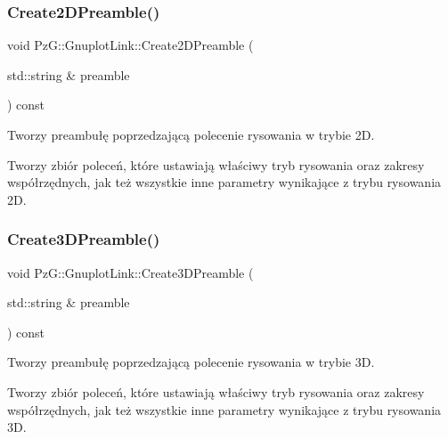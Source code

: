 \subsubsection{\texorpdfstring{Create2\+D\+Preamble()}{Create2DPreamble()}}
{\footnotesize\ttfamily void Pz\+G\+::\+Gnuplot\+Link\+::\+Create2\+D\+Preamble (\begin{DoxyParamCaption}\item[{std\+::string \&}]{preamble }\end{DoxyParamCaption}) const\hspace{0.3cm}{\ttfamily [protected]}}



Tworzy preambułę poprzedzającą polecenie rysowania w trybie 2D. 

Tworzy zbiór poleceń, które ustawiają właściwy tryb rysowania oraz zakresy współrzędnych, jak też wszystkie inne parametry wynikające z trybu rysowania 2D. \mbox{\label{class_pz_g_1_1_gnuplot_link_a475373e9f4e3ea655a64e7daabd56ac9}} 
\subsubsection{\texorpdfstring{Create3\+D\+Preamble()}{Create3DPreamble()}}
{\footnotesize\ttfamily void Pz\+G\+::\+Gnuplot\+Link\+::\+Create3\+D\+Preamble (\begin{DoxyParamCaption}\item[{std\+::string \&}]{preamble }\end{DoxyParamCaption}) const\hspace{0.3cm}{\ttfamily [protected]}}



Tworzy preambułę poprzedzającą polecenie rysowania w trybie 3D. 

Tworzy zbiór poleceń, które ustawiają właściwy tryb rysowania oraz zakresy współrzędnych, jak też wszystkie inne parametry wynikające z trybu rysowania 3D. \mbox{\label{class_pz_g_1_1_gnuplot_link_a81a78898b39cb0b4c79ea4f3c90bbeb5}} 
